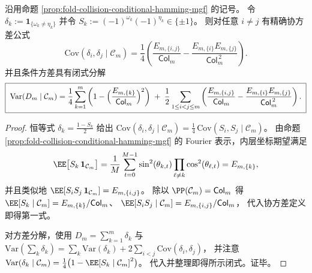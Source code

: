 \begin{proposition}\label{prop:fold-collision-conditional-hamming-covariance}
沿用命题 \ref{prop:fold-collision-conditional-hamming-mgf} 的记号。
令 \(\delta_k:=\mathbf 1_{\{\omega_k\neq\eta_k\}}\) 并令
\(
S_k:=(-1)^{\omega_k}(-1)^{\eta_k}\in\{\pm1\}
\)。
则对任意 \(i\neq j\) 有精确协方差公式
\[
\boxed{\;
\mathrm{Cov}(\delta_i,\delta_j\mid \mathcal C_m)
=\frac14\left(\frac{E_{m,\{i,j\}}}{\mathsf{Col}_m}-\frac{E_{m,\{i\}}E_{m,\{j\}}}{\mathsf{Col}_m^{\,2}}\right).\;}
\]
并且条件方差具有闭式分解
\[
\boxed{\;
\mathrm{Var}(D_m\mid\mathcal C_m)
=\frac14\sum_{k=1}^m\left(1-\Bigl(\frac{E_{m,\{k\}}}{\mathsf{Col}_m}\Bigr)^2\right)
\;+\;\frac12\sum_{1\le i<j\le m}\left(\frac{E_{m,\{i,j\}}}{\mathsf{Col}_m}-\frac{E_{m,\{i\}}E_{m,\{j\}}}{\mathsf{Col}_m^{\,2}}\right).\;}
\]
\end{proposition}

\begin{proof}
恒等式 \(\delta_k=\frac{1-S_k}{2}\) 给出
\(
\mathrm{Cov}(\delta_i,\delta_j\mid\mathcal C_m)=\frac14\,\mathrm{Cov}(S_i,S_j\mid\mathcal C_m)
\)。
由命题 \ref{prop:fold-collision-conditional-hamming-mgf} 的 Fourier 表示，内层坐标期望满足
\[
\EE\bigl[S_k\,\mathbf 1_{\mathcal C_m}\bigr]
=\frac1M\sum_{t=0}^{M-1}\sin^2(\theta_{k,t})\prod_{\ell\ne k}\cos^2(\theta_{\ell,t})
=E_{m,\{k\}},
\]
并且类似地
\(
\EE[S_iS_j\,\mathbf 1_{\mathcal C_m}]=E_{m,\{i,j\}}
\)。
除以 \(\PP(\mathcal C_m)=\mathsf{Col}_m\) 得
\(
\EE[S_k\mid\mathcal C_m]=E_{m,\{k\}}/\mathsf{Col}_m
\)、
\(
\EE[S_iS_j\mid\mathcal C_m]=E_{m,\{i,j\}}/\mathsf{Col}_m
\)，
代入协方差定义即得第一式。
\par
对方差分解，使用
\(
D_m=\sum_{k=1}^m\delta_k
\)
与
\(
\mathrm{Var}(\sum_k\delta_k)=\sum_k\mathrm{Var}(\delta_k)+2\sum_{i<j}\mathrm{Cov}(\delta_i,\delta_j)
\)，
并注意 \(\mathrm{Var}(\delta_k\mid\mathcal C_m)=\frac14\bigl(1-\EE[S_k\mid\mathcal C_m]^2\bigr)\)。
代入并整理即得所示闭式。证毕。
\end{proof}

\endinput
